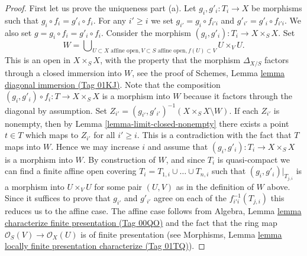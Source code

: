 \documentclass{amsart}
\theoremstyle{plain}
\theoremstyle{definition}
\theoremstyle{remark}
\numberwithin{equation}{subsection}
\begin{document}
\begin{proof}
\noindent
First let us prove the uniqueness part (a). Let $g_i, g'_i : T_i \to X$ be
morphisms such that $g_i \circ f_i = g'_i \circ f_i$. For any $i' \geq i$
we set $g_{i'} = g_i \circ f_{i'i}$ and $g'_{i'} = g'_i \circ f_{i'i}$.
We also set $g = g_i \circ f_i = g'_i \circ f_i$.
Consider the morphism
$(g_i, g'_i) : T_i \to X \times_S X$. Set
$$
W =
\bigcup\nolimits_{U \subset X\text{ affine open},
V \subset S\text{ affine open}, f(U) \subset V}
U \times_V U.
$$
This is an open in $X \times_S X$, with the property that the morphism
$\Delta_{X/S}$ factors through a closed immersion into $W$, see the proof
of Schemes, Lemma \href{https://stacks.math.columbia.edu/tag/01KJ}{lemma diagonal immersion (Tag 01KJ)}.
Note that the composition
$(g_i, g'_i) \circ f_i : T \to X \times_S X$ is a morphism into $W$
because it factors through the diagonal by assumption.
Set $Z_{i'} = (g_{i'}, g'_{i'})^{-1}(X \times_S X \setminus W)$.
If each $Z_{i'}$ is nonempty, then by Lemma \ref{lemma-limit-closed-nonempty}
there exists a point $t \in T$ which maps to $Z_{i'}$ for all
$i' \geq i$. This is a contradiction with the fact that $T$ maps into $W$.
Hence we may increase $i$ and assume that $(g_i, g'_i) : T_i \to X \times_S X$
is a morphism into $W$. By construction of $W$, and since $T_i$ is
quasi-compact we can find a finite affine open covering
$T_i = T_{1, i} \cup \ldots \cup T_{n, i}$ such that
$(g_i, g'_i)|_{T_{j, i}}$ is a morphism into $U \times_V U$ for
some pair $(U, V)$ as in the definition of $W$ above.
Since it suffices to prove that $g_{i'}$ and $g'_{i'}$ agree
on each of the $f_{i'i}^{-1}(T_{j, i})$ this reduces us to the affine case.
The affine case follows from
Algebra, Lemma \href{https://stacks.math.columbia.edu/tag/00QO}{lemma characterize finite presentation (Tag 00QO)}
and the fact that the ring map
$\mathcal{O}_S(V) \to \mathcal{O}_X(U)$ is of finite presentation
(see Morphisms,
Lemma \href{https://stacks.math.columbia.edu/tag/01TQ}{lemma locally finite presentation characterize (Tag 01TQ)}).


\end{proof}
\end{document}
